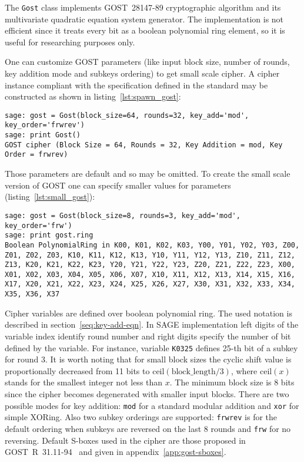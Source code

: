 The \verb+Gost+ class implements GOST~28147-89 cryptographic algorithm and its
multivariate quadratic equation system generator. The implementation is not
efficient since it treats every bit as a boolean polynomial ring element, so it
is useful for researching purposes only. 

One can customize GOST parameters (like input block size, number of rounds, key
addition mode and subkeys ordering) to get small scale cipher. A cipher instance
compliant with the specification defined in the standard may be constructed as
shown in listing~\ref{lst:spawn_gost}:
\begin{lstlisting}[label=lst:spawn_gost, caption=Creating GOST instance]
sage: gost = Gost(block_size=64, rounds=32, key_add='mod', key_order='frwrev')
sage: print Gost()
GOST cipher (Block Size = 64, Rounds = 32, Key Addition = mod, Key Order = frwrev)
\end{lstlisting}
Those parameters are default and so may be omitted. To create the small scale
version of GOST one can specify smaller values for parameters
(listing~\ref{lst:small_gost}):
\begin{lstlisting}[label=lst:small_gost, caption=Small scale GOST]
sage: gost = Gost(block_size=8, rounds=3, key_add='mod', key_order='frw')
sage: print gost.ring
Boolean PolynomialRing in K00, K01, K02, K03, Y00, Y01, Y02, Y03, Z00, Z01, Z02, Z03, K10, K11, K12, K13, Y10, Y11, Y12, Y13, Z10, Z11, Z12, Z13, K20, K21, K22, K23, Y20, Y21, Y22, Y23, Z20, Z21, Z22, Z23, X00, X01, X02, X03, X04, X05, X06, X07, X10, X11, X12, X13, X14, X15, X16, X17, X20, X21, X22, X23, X24, X25, X26, X27, X30, X31, X32, X33, X34, X35, X36, X37
\end{lstlisting}

Cipher variables are defined over boolean polynomial ring. The used notation
is described in section~\ref{seq:key-add-eqn}. In SAGE implementation left digits of the variable index
identify round number and right digits specify the number of bit defined by the
variable. For instance, variable \verb+K0325+ defines 25-th bit of a subkey for round 3. It is
worth noting that for small block sizes the cyclic shift value is
proportionally decreased from 11 bits to 
$\text{ceil}(\text{block\_length} / 3)$,
where $\text{ceil}(x)$ stands for the smallest integer not less than $x$. The
minimum block size is 8 bits since the cipher becomes degenerated with smaller
input blocks.
There are two possible modes for key addition: \verb+mod+ for a standard modular
addition and \verb+xor+ for simple XORing. Also two subkey orderings are
supported: \verb+frwrev+ is for the default ordering when subkeys are reversed on
the last 8 rounds and \verb+frw+ for no reversing. Default S-boxes used in the
cipher are those proposed in GOST~R~31.11-94~\cite{GOST3411} and given in
appendix~\ref{app:gost-sboxes}.

